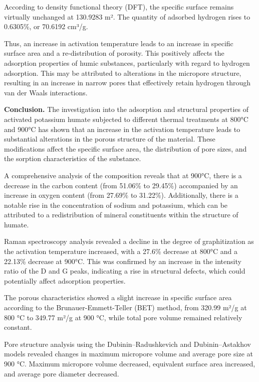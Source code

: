 \begin{multicols}{2}
According to density functional theory (DFT), the specific surface
remains virtually unchanged at 130.9283 m². The quantity of adsorbed
hydrogen rises to 0.6305\%, or 70.6192 cm³/g.

Thus, an increase in activation temperature leads to an increase in
specific surface area and a re-distribution of porosity. This positively
affects the adsorption properties of humic substances, particularly with
regard to hydrogen adsorption. This may be attributed to alterations in
the micropore structure, resulting in an increase in narrow pores that
effectively retain hydrogen through van der Waals interactions.

{\bfseries Conclusion.} The investigation into the adsorption and
structural properties of activated potassium humate subjected to
different thermal treatments at 800°C and 900°C has shown that an
increase in the activation temperature leads to substantial alterations
in the porous structure of the material. These modifications affect the
specific surface area, the distribution of pore sizes, and the sorption
characteristics of the substance.

A comprehensive analysis of the composition reveals that at 900°C, there
is a decrease in the carbon content (from 51.06\% to 29.45\%)
accompanied by an increase in oxygen content (from 27.69\% to 31.22\%).
Additionally, there is a notable rise in the concentration of sodium and
potassium, which can be attributed to a redistribution of mineral
constituents within the structure of humate.

Raman spectroscopy analysis revealed a decline in the degree of
graphitization as the activation temperature increased, with a 27.6\%
decrease at 800°C and a 22.13\% decrease at 900°C. This was confirmed by
an increase in the intensity ratio of the D and G peaks, indicating a
rise in structural defects, which could potentially affect adsorption
properties.

The porous characteristics showed a slight increase in specific surface
area according to the Brunauer-Emmett-Teller (BET) method, from 320.99
m²/g at 800 °C to 349.77 m²/g at 900 °C, while total pore volume
remained relatively constant.

Pore structure analysis using the Dubinin--Radushkevich and
Dubinin--Astakhov models revealed changes in maximum micropore volume
and average pore size at 900 °C. Maximum micropore volume decreased,
equivalent surface area increased, and average pore diameter decreased.


\end{multicols}
